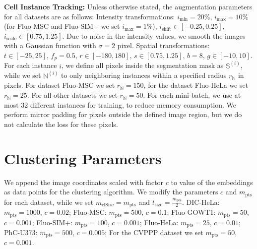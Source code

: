 \documentclass[runningheads,a4paper]{llncs}
\begin{document}
\begin{appendices}
\noindent\textbf{Cell Instance Tracking:}
Unless otherwise stated, the augmentation parameters for all datasets are as follows:
Intensity transformations: $i_{\text{min}}=20\%$, $i_{\text{max}}=10\%$ (for Fluo-MSC and Fluo-SIM+ we set $i_{\text{max}}=1\%$), $i_{\text{shift}} \in [-0.25, 0.25]$, $i_{\text{scale}}\in[0.75, 1.25]$.
Due to noise in the intensity values, we smooth the images with a Gaussian function with $\sigma=2$ pixel.
Spatial transformations: $t\in[-25, 25]$, $f_p=0.5$, $r\in[-180, 180]$, $s\in[0.75, 1.25]$, $b=8$, $g\in[-10, 10]$.
%
For each instance $i$, we define all pixels inside the segmentation mask as $\mathbb{S}^{(i)}$, while we set $\mathbb{N}^{(i)}$ to only neighboring instances within a specified radius $r_{\mathbb{N}}$ in pixels.
For dataset Fluo-MSC we set $r_{\mathbb{N}}=150$, for the dataset Fluo-HeLa we set $r_{\mathbb{N}}=25$. For all other datasets we set $r_{\mathbb{N}}=50$.
For each mini-batch, we use at most 32 different instances for training, to reduce memory consumption.
We perform mirror padding for pixels outside the defined image region, but we do not calculate the loss for these pixels.

\section{Clustering Parameters}

We append the image coordinates scaled with factor $c$ to value of the embeddings as data points for the clustering algorithm.
We modify the parameters $c$ and $m_{\text{pts}}$ for each dataset, while we set $m_{\text{clSize}}=m_{\text{pts}}$ and $t_{\text{size}}=\frac{m_{\text{pts}}}{2}$.
DIC-HeLa: $m_{\text{pts}}=1000$, $c=0.02$;
Fluo-MSC: $m_{\text{pts}}=500$, $c=0.1$;
Fluo-GOWT1: $m_{\text{pts}}=50$, $c=0.001$;
Fluo-SIM+: $m_{\text{pts}}=100$, $c=0.001$;
Fluo-HeLa: $m_{\text{pts}}=25$, $c=0.01$;
PhC-U373: $m_{\text{pts}}=500$, $c=0.005$;
For the CVPPP dataset we set $m_{\text{pts}}=50$, $c=0.001$.


\end{appendices}
\end{document}
